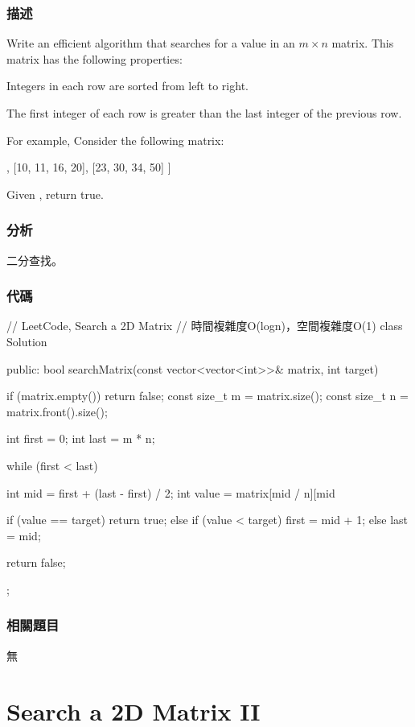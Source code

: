 \subsubsection{描述}
Write an efficient algorithm that searches for a value in an $m \times n$ matrix. This matrix has the following properties:
\begindot
\item Integers in each row are sorted from left to right.
\item The first integer of each row is greater than the last integer of the previous row.
\myenddot

For example, Consider the following matrix:
\begin{Code}
[
  [1,   3,  5,  7],
  [10, 11, 16, 20],
  [23, 30, 34, 50]
]
\end{Code}
Given , return true.


\subsubsection{分析}
二分查找。


\subsubsection{代碼}
\begin{Code}
// LeetCode, Search a 2D Matrix
// 時間複雜度O(logn)，空間複雜度O(1)
class Solution {
public:
    bool searchMatrix(const vector<vector<int>>& matrix, int target) {
        if (matrix.empty()) return false;
        const size_t  m = matrix.size();
        const size_t n = matrix.front().size();

        int first = 0;
        int last = m * n;

        while (first < last) {
            int mid = first + (last - first) / 2;
            int value = matrix[mid / n][mid %

            if (value == target)
                return true;
            else if (value < target)
                first = mid + 1;
            else
                last = mid;
        }

        return false;
    }
};
\end{Code}


\subsubsection{相關題目}
\begindot
\item 無
\myenddot

\section{Search a 2D Matrix II} %
\label{sec:search-a-2d-matrix-ii}


